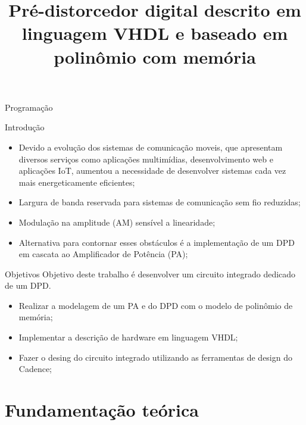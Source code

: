 \documentclass{if-beamer}
\title[Pré-distorcedor digital descrito em linguagem VHDL e baseado em polinômio com memória.]{\textbf{Pré-distorcedor digital descrito em linguagem VHDL e baseado em polinômio com memória}}
\subtitle{}
\author[Leonardo de Andrade Santos]{\large \negrito{Leonardo de Andrade Santos}}
\institute[UFPR/PR]{
    \small \textit{Universidade Federal do Paraná} \\
}
\date{\the\year}
\begin{document}
\begin{frame}
  \titlepage
\end{frame}

\begin{frame}{Programação}
  \tableofcontents
\end{frame}

\begin{frame}{Introdução}
\begin{itemize}
	\item Devido a evolução dos sistemas de comunicação moveis, que apresentam diversos serviços como aplicações multimídias, desenvolvimento web e aplicações IoT, aumentou a necessidade de desenvolver sistemas cada vez mais energeticamente eficientes;
	\item Largura de banda reservada para sistemas de comunicação sem fio reduzidas;
	\item Modulação na amplitude (AM) sensível a linearidade;
	\item Alternativa para contornar esses obstáculos é a implementação de um DPD em cascata ao Amplificador de Potência (PA);
\end{itemize}
\end{frame}

\begin{frame}{Objetivos}
	Objetivo deste trabalho é desenvolver um circuito integrado dedicado de um DPD.
	\begin{itemize}
		\item Realizar a modelagem de um PA e do DPD com o modelo de polinômio de memória;
		\item Implementar a descrição de hardware em 
		linguagem VHDL;
		\item Fazer o desing do circuito integrado utilizando as ferramentas de design do Cadence;
	\end{itemize}
\end{frame}



\section{Fundamentação teórica}

\end{document}
